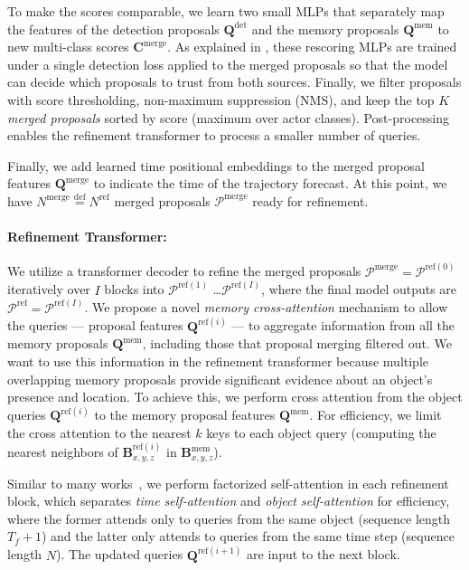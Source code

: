 To make the scores comparable, we learn two small MLPs that separately map the features of the detection proposals $\mathbf{Q}^\mathrm{det}$ and the memory proposals $\mathbf{Q}^\mathrm{mem}$
to new multi-class scores $\mathbf{C}^\mathrm{merge}$.
As explained in ,
these rescoring MLPs are trained under a single detection loss applied to the merged proposals so that the model can decide which proposals to trust from both sources.
Finally, we filter proposals with score thresholding, non-maximum suppression (NMS), and keep the top $K$
\textit{merged proposals} sorted by score (maximum over actor classes).
Post-processing enables the refinement transformer to process a smaller number of queries.

Finally, we add learned time positional embeddings to the merged proposal features $\mathbf{Q}^\mathrm{merge}$
to indicate the time of the trajectory forecast.
At this point, we have $N^\mathrm{merge} \overset{\mathrm{def}}{=} N^\mathrm{ref}$ merged proposals $\mathcal{P}^\mathrm{merge}$ ready for refinement.

\paragraph{Refinement Transformer:}
We utilize a transformer decoder to refine the merged proposals $\mathcal{P}^\mathrm{merge} = \mathcal{P}^{\mathrm{ref}(0)}$
iteratively over $I$ blocks into $\mathcal{P}^{\mathrm{ref}(1)}$ \dots $\mathcal{P}^{\mathrm{ref}(I)}$,
where the final model outputs are $\mathcal{P}^\mathrm{ref} = \mathcal{P}^{\mathrm{ref}(I)}$.
We propose a novel \textit{memory cross-attention}
mechanism to allow the queries --- proposal features $\mathbf{Q}^{\mathrm{ref}(i)}$ --- to aggregate information from all the memory proposals $\mathbf{Q}^{\mathrm{mem}}$,
including those that proposal merging filtered out.
We want to use this information in the refinement transformer because multiple overlapping memory proposals provide significant evidence about an object's presence and location.
To achieve this, we perform cross attention from the object queries $\mathbf{Q}^{\mathrm{ref}(i)}$ to the memory proposal features $\mathbf{Q}^\mathrm{mem}$.
For efficiency, we limit the cross attention to the nearest $k$ keys to each object query (computing the nearest neighbors of $\mathbf{B}^{\mathrm{ref}(i)}_{x, y, z}$ in $\mathbf{B}^{\mathrm{mem}}_{x, y, z}$).

Similar to many works~\cite{ngiam2021scene,casas2024detra}, we perform factorized self-attention in each refinement block, which separates \textit{time self-attention} and \textit{object self-attention} for efficiency, where the former attends only to queries from the same object (sequence length $T_f + 1$) and the latter only attends to queries from the same time step (sequence length $N$).
The updated queries $\mathbf{Q}^{\mathrm{ref}(i+1)}$ are input to the next block.

